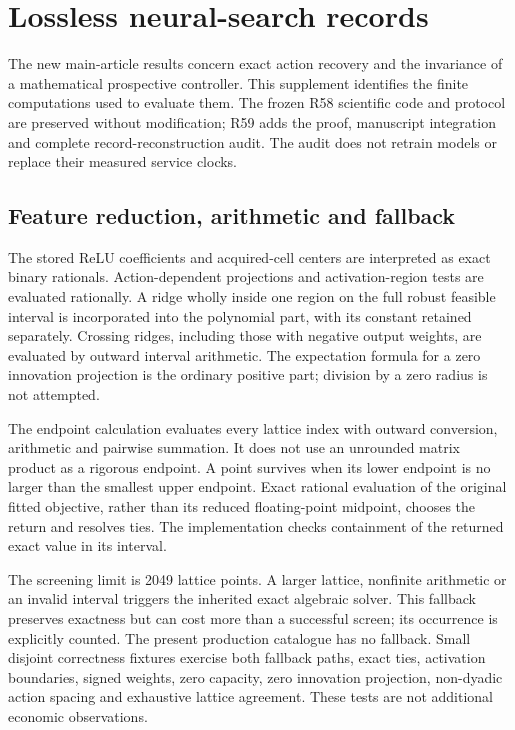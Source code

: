 \section{Lossless neural-search records}\label{supp:lossless59}
The new main-article results concern exact action recovery and the invariance of a mathematical prospective controller. This supplement identifies the finite computations used to evaluate them. The frozen R58 scientific code and protocol are preserved without modification; R59 adds the proof, manuscript integration and complete record-reconstruction audit. The audit does not retrain models or replace their measured service clocks.

\subsection{Feature reduction, arithmetic and fallback}
The stored ReLU coefficients and acquired-cell centers are interpreted as exact binary rationals. Action-dependent projections and activation-region tests are evaluated rationally. A ridge wholly inside one region on the full robust feasible interval is incorporated into the polynomial part, with its constant retained separately. Crossing ridges, including those with negative output weights, are evaluated by outward interval arithmetic. The expectation formula for a zero innovation projection is the ordinary positive part; division by a zero radius is not attempted.

The endpoint calculation evaluates every lattice index with outward conversion, arithmetic and pairwise summation. It does not use an unrounded matrix product as a rigorous endpoint. A point survives when its lower endpoint is no larger than the smallest upper endpoint. Exact rational evaluation of the original fitted objective, rather than its reduced floating-point midpoint, chooses the return and resolves ties. The implementation checks containment of the returned exact value in its interval.

The screening limit is 2049 lattice points. A larger lattice, nonfinite arithmetic or an invalid interval triggers the inherited exact algebraic solver. This fallback preserves exactness but can cost more than a successful screen; its occurrence is explicitly counted. The present production catalogue has no fallback. Small disjoint correctness fixtures exercise both fallback paths, exact ties, activation boundaries, signed weights, zero capacity, zero innovation projection, non-dyadic action spacing and exhaustive lattice agreement. These tests are not additional economic observations.

